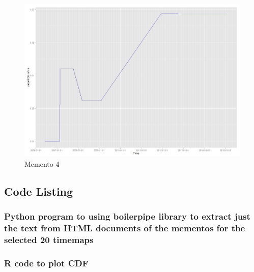 \begin{enumerate}
\newpage
\begin{figure}[ht]    
    \begin{center}
        \includegraphics[scale=0.40]{graphs/3_j7.png}
        \caption{Memento 4}
    \end{center}
\end{figure}



\newpage
\subsection{Code Listing}
\subsubsection{Python program to using boilerpipe library to extract just the text from HTML documents of the mementos for the selected 20 timemaps}

\newpage

\subsubsection{R code to plot CDF}


\end{enumerate}

